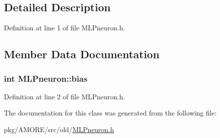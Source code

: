\subsection{Detailed Description}


Definition at line 1 of file MLPneuron.h.



\subsection{Member Data Documentation}
\hypertarget{class_m_l_pneuron_a6f8cb5b2fbf48db003ea8a413ffdbd8b}{
\subsubsection[{bias}]{\setlength{\rightskip}{0pt plus 5cm}int {\bf MLPneuron::bias}}}
\label{class_m_l_pneuron_a6f8cb5b2fbf48db003ea8a413ffdbd8b}


Definition at line 2 of file MLPneuron.h.



The documentation for this class was generated from the following file:\begin{DoxyCompactItemize}
\item 
pkg/AMORE/src/old/\hyperlink{_m_l_pneuron_8h}{MLPneuron.h}\end{DoxyCompactItemize}
